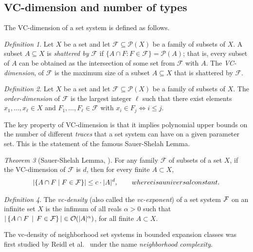 \documentclass[1p,number,a4paper]{elsarticle}
\theoremstyle{remark}
\newcommand{\Oof}{\mathcal{O}}
\newcommand{\Ff}{\mathcal{F}}
\newcommand{\setof}[2]{\left\{#1 \,\mid\, #2 \right\}}
\newtheorem{theorem}{Theorem}[section]
\newtheorem{definition}[theorem]{Definition}
\begin{document}
\subsection{VC-dimension and number of types}

The VC-dimension of a set system is defined as follows. 

\begin{definition}
    Let $X$ be a set and let  $\Ff\subseteq \mathcal{P}(X)$ 
    be a family of subsets of $X$.
    A subset $A\subseteq X$ is \emph{shattered by $\Ff$} if
    $\{A\cap F\colon F\in \Ff\}=\mathcal{P}(A)$; that is, every subset of $A$ can be obtained as the intersection of some set from $\Ff$ with $A$. 
    The \emph{VC-dimension},
    of $\Ff$ is the maximum size of a subset $A\subseteq X$ that is shattered by
    $\Ff$.
\end{definition}

\begin{definition}
    Let $X$ be a set and let  $\Ff\subseteq \mathcal{P}(X)$ 
    be a family of subsets of $X$.
    The \emph{order-dimension} of $\Ff$ is the largest integer $\ell$ such that
    there exist elements $x_1,\ldots, x_\ell\in X$ and $F_1,\ldots, F_\ell\in \Ff$ with $x_i\in F_j\Leftrightarrow i\leq j$. 
\end{definition}

The key property of VC-dimension is that it implies polynomial upper bounds on the number of different \emph{traces} that a set system can have on a given parameter set. This is the statement of the famous Sauer-Shelah Lemma.

\begin{theorem}[Sauer-Shelah Lemma, \cite{sauer1972density, shelah1972combinatorial,chervonenkis1971theory}]\label{thm:sauer-shelah}
  For any family $\Ff$ of subsets of a set $X$, if the VC-dimension of $\Ff$ is $d$,
  then for every finite $A\subset X$,
$$|\{A\cap F \mid F\in {\cal F}\}|\le c\cdot |A|^d,  
\qquad\textit{where $c$ is a universal constant.}$$
\end{theorem}

\begin{definition}
    The \emph{vc-density} (also called the 
    \emph{vc-exponent})
    of a set system $\cal F$
    on an infinite set $X$ is the infimum of all reals $\alpha>0$ such that 
    $|\setof{A\cap F}{F\in \cal F}|\in \Oof(|A|^\alpha)$, for all finite $A\subset X$. 
    \end{definition}

The vc-density of neighborhood set systems in bounded expansion classes was first studied by Reidl et al.~\cite{Reidl16,reidl2019characterising} under the name \emph{neighborhood complexity}. 
\end{document}

